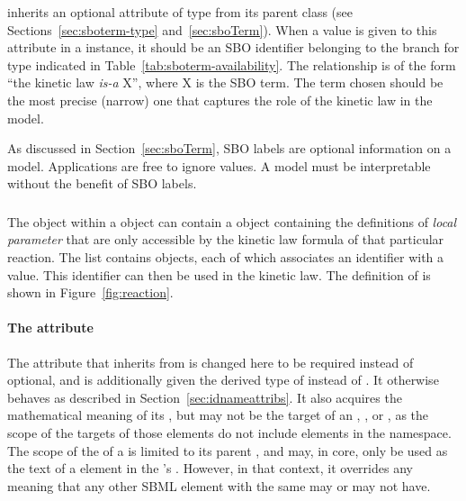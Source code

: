\KineticLaw  inherits an optional 
attribute of type  from its parent
class \SBase (see Sections~\ref{sec:sboterm-type}
and~\ref{sec:sboTerm}).  When a value is given to this
attribute in a  \KineticLaw instance, it should be an
SBO identifier belonging to the branch for type  \KineticLaw
indicated in Table~\ref{tab:sboterm-availability}.  The relationship is
of the form ``the kinetic law \emph{is-a} X'', where X is
the SBO term.  The term chosen should be the most precise (narrow)
one that captures the role of the kinetic law in the model.

As discussed in Section~\ref{sec:sboTerm}, SBO labels are optional
information on a model.  Applications are free to ignore
 values.  A model must be interpretable without the
benefit of SBO labels.


\subsubsection{}
\label{subsec:localparameter}

The \KineticLaw object within a \Reaction object can contain a
\ListOfLocalParameters object containing the definitions of
\emph{local parameter} that are only accessible by the kinetic law
formula of that particular reaction.  The list contains
\LocalParameter objects, each of which associates an identifier
with a value.  This identifier can then be used in the kinetic
law.  The definition of \LocalParameter is shown in
Figure~\vref{fig:reaction}.


\begin{blockChanged}
\paragraph{The  attribute}

The  attribute that \LocalParameter inherits from \SBase is changed here to be required instead of optional, and is additionally given the derived type of  instead of .  It otherwise behaves as described in Section~\ref{sec:idnameattribs}.  It also acquires the mathematical meaning of its , but may not be the target of an \InitialAssignment, \EventAssignment, or \Rule, as the scope of the targets of those elements do not include elements in the  namespace.  The scope of the  of a \LocalParameter is limited to its parent \KineticLaw, and may, in core, only be used as the text of a  element in the \KineticLaw's .  However, in that context, it overrides any meaning that any other SBML element with the same  may or may not have.
\end{blockChanged}

